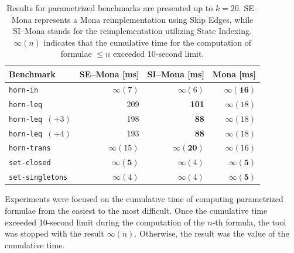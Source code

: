 \documentclass[pdflatex,sn-mathphys-num]{sn-jnl}%
\theoremstyle{thmstyleone}%
\theoremstyle{thmstyletwo}%
\theoremstyle{thmstylethree}%
\begin{document}
        \begin{table}[!h]
            \centering
            \captionsetup{width=\textwidth, justification=justified}
            \small
            \begin{tabular}{|l||r|r|r|}
                \hline
                Benchmark        	& SE--Mona [ms] & SI--Mona [ms] & Mona [ms]\\[0.5ex]
                \hline\hline
                \texttt{horn-in}   & $\infty(7)$  & $\infty(6)$ & \cellcolor{gray!25}$\mathbf{\infty(16)}$ \\[0.5ex]
                \texttt{horn-leq}   & 209  & \cellcolor{gray!25}\textbf{101} & $\infty(18)$ \\[0.5ex]
                \texttt{horn-leq $(+3)$}   & 198  & \cellcolor{gray!25}\textbf{88} & $\infty(18)$ \\[0.5ex]
                \texttt{horn-leq $(+4)$}   & 193  & \cellcolor{gray!25}\textbf{88} & $\infty(18)$ \\[0.5ex]
                \texttt{horn-trans}   & $\infty(15)$  & \cellcolor{gray!25}$\mathbf{\infty(20)}$ & $\infty(16)$ \\[0.5ex]
                \texttt{set-closed}   & \cellcolor{gray!25}$\mathbf{\infty(5)}$  & $\infty(4)$ & \cellcolor{gray!25}$\mathbf{\infty(5)}$ \\[0.5ex]
                \texttt{set-singletons}   & $\infty(4)$  & $\infty(4)$ & \cellcolor{gray!25}$\mathbf{\infty(5)}$ \\[0.5ex]

                \hline
            \end{tabular}
            \normalsize
            \vspace*{0.5em}
            \caption{Results for parametrized benchmarks are presented up to $k = 20$. SE--Mona represents a Mona reimplementation using Skip Edges, while SI--Mona stands for the reimplementation utilizing State Indexing. $\infty(n)$ indicates that the cumulative time for the computation of formulae $\leq n$ exceeded 10-second limit.}
            \label{table}
        \end{table}

        Experiments were focused on the cumulative time of computing parametrized formulae from the easiest to the most difficult. Once the cumulative time exceeded 10-second limit during the computation of the $n$-th formula, the tool was stopped with the result $\infty(n)$. Otherwise, the result was the value of the cumulative time.
\end{document}
